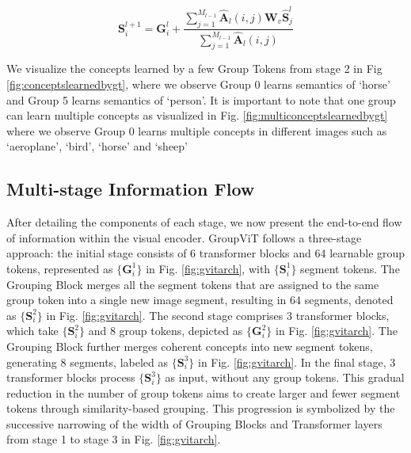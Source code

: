 \begin{equation}
\label{eq:grouping_output}
{\textbf{S}}^{l+1}_{i} = \textbf{G}_i^{l} + \frac{\sum_{j=1}^{M_{l-1}} \hat{\textbf{A}}_l(i,j){\textbf{W}}_{v}\hat{\textbf{S}}^l_j}{\sum_{j=1}^{M_{l-1}} \hat{\textbf{A}}_l(i,j)}
\end{equation}


We visualize the concepts learned by a few Group Tokens from stage 2 in Fig \ref{fig:conceptslearnedbygt}, where we observe Group 0 learns semantics of `horse' and Group 5 learns semantics of `person'. It is important to note that one group can learn multiple concepts as visualized in Fig. \ref{fig:multiconceptslearnedbygt} where we observe Group 0 learns multiple concepts in different images such as `aeroplane', `bird', `horse' and `sheep'





\subsection{Multi-stage Information Flow}
After detailing the components of each stage, we now present the end-to-end flow of information within the visual encoder. GroupViT follows a three-stage approach: the initial stage consists of 6 transformer blocks and 64 learnable group tokens, represented as $\{\textbf{G}_i^{1}\}$ in Fig. \ref{fig:gvitarch}, with $\{\textbf{S}_i^{1}\}$ segment tokens. The Grouping Block merges all the segment tokens that are assigned to the same group token into a single new image segment, resulting in 64 segments, denoted as $\{\textbf{S}_i^{2}\}$ in Fig. \ref{fig:gvitarch}. The second stage comprises 3 transformer blocks, which take $\{\textbf{S}_i^{2}\}$ and 8 group tokens, depicted as $\{\textbf{G}_i^{2}\}$ in Fig. \ref{fig:gvitarch}. The Grouping Block further merges coherent concepts into new segment tokens, generating 8 segments, labeled as $\{\textbf{S}_i^{3}\}$ in Fig. \ref{fig:gvitarch}. In the final stage, 3 transformer blocks process $\{\textbf{S}_i^{3}\}$ as input, without any group tokens. This gradual reduction in the number of group tokens aims to create larger and fewer segment tokens through similarity-based grouping. This progression is symbolized by the successive narrowing of the width of Grouping Blocks and Transformer layers from stage 1 to stage 3 in Fig. \ref{fig:gvitarch}.


